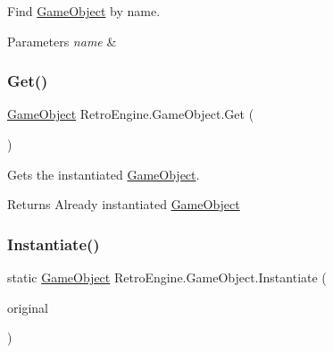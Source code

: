 Find \mbox{\hyperlink{class_retro_engine_1_1_game_object}{Game\+Object}} by name. 


\begin{DoxyParams}{Parameters}
{\em name} & \\
\hline
\end{DoxyParams}
\mbox{\label{class_retro_engine_1_1_game_object_adddb1e0ce43e32f5747258d9b92a66c0}} 
\subsubsection{\texorpdfstring{Get()}{Get()}}
{\footnotesize\ttfamily \mbox{\hyperlink{class_retro_engine_1_1_game_object}{Game\+Object}} Retro\+Engine.\+Game\+Object.\+Get (\begin{DoxyParamCaption}{ }\end{DoxyParamCaption})}



Gets the instantiated \mbox{\hyperlink{class_retro_engine_1_1_game_object}{Game\+Object}}. 

\begin{DoxyReturn}{Returns}
Already instantiated \mbox{\hyperlink{class_retro_engine_1_1_game_object}{Game\+Object}}
\end{DoxyReturn}
\mbox{\label{class_retro_engine_1_1_game_object_ad94d117d650784cdcc2421bcba8eaf63}} 
\subsubsection{\texorpdfstring{Instantiate()}{Instantiate()}\hspace{0.1cm}{\footnotesize\ttfamily [1/2]}}
{\footnotesize\ttfamily static \mbox{\hyperlink{class_retro_engine_1_1_game_object}{Game\+Object}} Retro\+Engine.\+Game\+Object.\+Instantiate (\begin{DoxyParamCaption}\item[{\mbox{\hyperlink{class_retro_engine_1_1_game_object}{Game\+Object}}}]{original }\end{DoxyParamCaption})\hspace{0.3cm}{\ttfamily [static]}}



